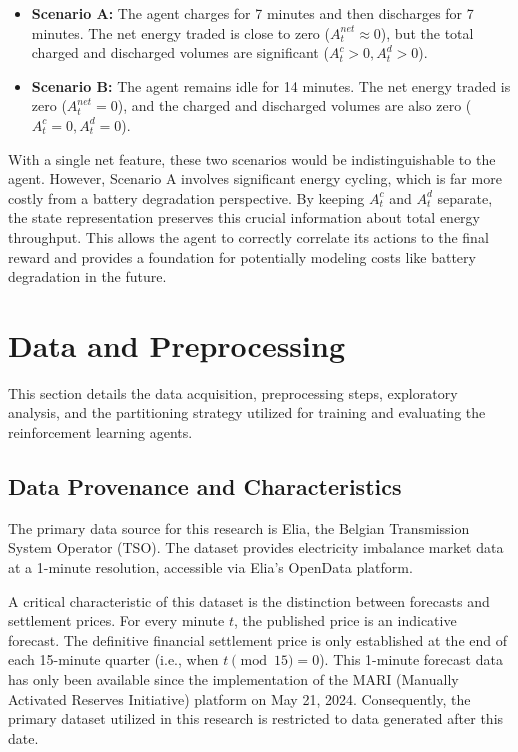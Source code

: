     \begin{itemize}
        \item \textbf{Scenario A:} The agent charges for 7 minutes and then discharges for 7 minutes. The net energy traded is close to zero ($A^{net}_t \approx 0$), but the total charged and discharged volumes are significant ($A^c_t > 0, A^d_t > 0$).
        
        \item \textbf{Scenario B:} The agent remains idle for 14 minutes. The net energy traded is zero ($A^{net}_t = 0$), and the charged and discharged volumes are also zero ($A^c_t = 0, A^d_t = 0$).
    \end{itemize}
    
    With a single net feature, these two scenarios would be indistinguishable to the agent. However, Scenario A involves significant energy cycling, which is far more costly from a battery degradation perspective. By keeping $A^c_t$ and $A^d_t$ separate, the state representation preserves this crucial information about total energy throughput. This allows the agent to correctly correlate its actions to the final reward and provides a foundation for potentially modeling costs like battery degradation in the future.

\section{Data and Preprocessing}
This section details the data acquisition, preprocessing steps, exploratory analysis, and the partitioning strategy utilized for training and evaluating the reinforcement learning agents. 

\subsection{Data Provenance and Characteristics}
The primary data source for this research is Elia, the Belgian Transmission System Operator (TSO). The dataset provides electricity imbalance market data at a 1-minute resolution, accessible via Elia's OpenData platform. 

A critical characteristic of this dataset is the distinction between forecasts and settlement prices. For every minute $t$, the published price is an indicative forecast. The definitive financial settlement price is only established at the end of each 15-minute quarter (i.e., when $t \pmod{15} = 0$). This 1-minute forecast data has only been available since the implementation of the MARI (Manually Activated Reserves Initiative) platform on May 21, 2024. Consequently, the primary dataset utilized in this research is restricted to data generated after this date.

